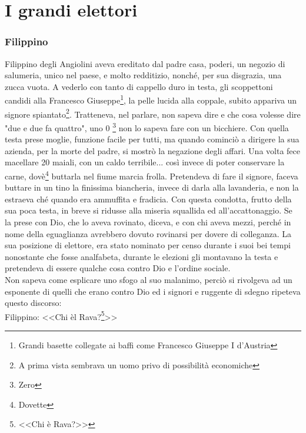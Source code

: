
\chapter{I grandi elettori}
\subsection{Filippino}
Filippino degli Angiolini aveva ereditato dal padre casa, poderi, un negozio di salumeria, unico nel paese, e molto redditizio, nonché, per sua disgrazia, una zucca vuota. A vederlo con tanto di cappello duro in testa, gli scoppettoni candidi alla Francesco Giuseppe\footnote{Grandi basette collegate ai baffi come Francesco Giuseppe I d'Austria}, la pelle lucida alla coppale, subito appariva un signore spiantato\footnote{A prima vista sembrava un uomo privo di possibilità economiche}. Tratteneva, nel parlare, non sapeva dire e che cosa volesse dire "due e due fa quattro", uno 0 \footnote{Zero} non lo sapeva fare con un bicchiere. Con quella testa prese moglie, funzione facile per tutti, ma quando cominciò a dirigere la sua azienda, per la morte del padre, si mostrò la negazione degli affari. Una volta fece macellare 20 maiali, con un caldo terribile... così invece di poter conservare la carne, dovè\footnote{Dovette} buttarla nel fiume marcia frolla. Pretendeva di fare il signore, faceva buttare in un tino la finissima biancheria, invece di darla alla lavanderia, e non la estraeva ché quando era ammuffita e fradicia. Con questa condotta, frutto della sua poca testa, in breve si ridusse alla miseria squallida ed all'accattonaggio. Se la prese con Dio, che lo aveva rovinato, diceva, e con chi aveva mezzi, perché in nome della eguaglianza avrebbero dovuto rovinarsi per dovere di colleganza. La sua posizione di elettore, era stato nominato per censo durante i suoi bei tempi nonostante che fosse analfabeta, durante le elezioni gli montavano la testa e pretendeva di essere qualche cosa contro Dio e l'ordine sociale. \\
\indent Non sapeva come esplicare uno sfogo al suo malanimo, perciò si rivolgeva ad un esponente di quelli che erano contro Dio ed i signori e ruggente di sdegno ripeteva questo discorso:\\
\indent {}Filippino: <<Chi èl Rava?\footnote{<<Chi è Rava?>>}>>\\
